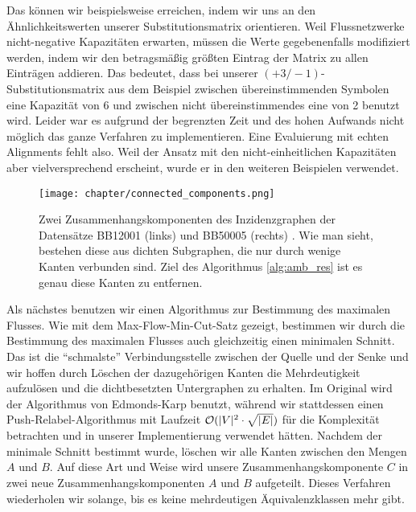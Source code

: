 Das können wir beispielsweise erreichen, indem wir uns an den Ähnlichkeitswerten unserer Substitutionsmatrix orientieren. Weil Flussnetzwerke nicht-negative Kapazitäten erwarten, müssen die Werte gegebenenfalls modifiziert werden, indem wir den betragsmäßig größten Eintrag der Matrix zu allen Einträgen addieren. Das bedeutet, dass bei unserer $(+3/-1)$-Substitutionsmatrix aus dem Beispiel zwischen übereinstimmenden Symbolen eine Kapazität von 6 und zwischen nicht übereinstimmendes eine von 2 benutzt wird. Leider war es aufgrund der begrenzten Zeit und des hohen Aufwands nicht möglich das ganze Verfahren zu implementieren. Eine Evaluierung mit echten Alignments fehlt also. Weil der Ansatz mit den nicht-einheitlichen Kapazitäten aber vielversprechend erscheint, wurde er in den weiteren Beispielen verwendet.

\begin{wrapfigure}{l}{6cm}
	\centering
	\texttt{[image: chapter/connected\_components.png]}
	\caption{\unskip}
	Zwei Zusammenhangskomponenten des Inzidenzgraphen der Datensätze BB12001 (links) und BB50005 (rechts) \cite{cpm10}. Wie man sieht, bestehen diese aus dichten Subgraphen, die nur durch wenige Kanten verbunden sind. Ziel des Algorithmus \ref{alg:amb_res} ist es genau diese Kanten zu entfernen.
\end{wrapfigure}

Als nächstes benutzen wir einen Algorithmus zur Bestimmung des maximalen Flusses. Wie mit dem Max-Flow-Min-Cut-Satz gezeigt, bestimmen wir durch die Bestimmung des maximalen Flusses auch gleichzeitig einen minimalen Schnitt. Das ist die \enquote{schmalste} Verbindungsstelle zwischen der Quelle und der Senke und wir hoffen durch Löschen der dazugehörigen Kanten die Mehrdeutigkeit aufzulösen und die dichtbesetzten Untergraphen zu erhalten. Im Original wird der Algorithmus von Edmonds-Karp benutzt, während wir stattdessen einen Push-Relabel-Algorithmus mit Laufzeit $\mathcal{O}(|V|^2\cdot \sqrt{|E|})$ für die Komplexität betrachten und in unserer Implementierung verwendet hätten. Nachdem der minimale Schnitt bestimmt wurde, löschen wir alle Kanten zwischen den Mengen $A$ und $B$. Auf diese Art und Weise wird unsere Zusammenhangskomponente $C$ in zwei neue Zusammenhangskomponenten $A$ und $B$ aufgeteilt. Dieses Verfahren wiederholen wir solange, bis es keine mehrdeutigen Äquivalenzklassen mehr gibt. 


